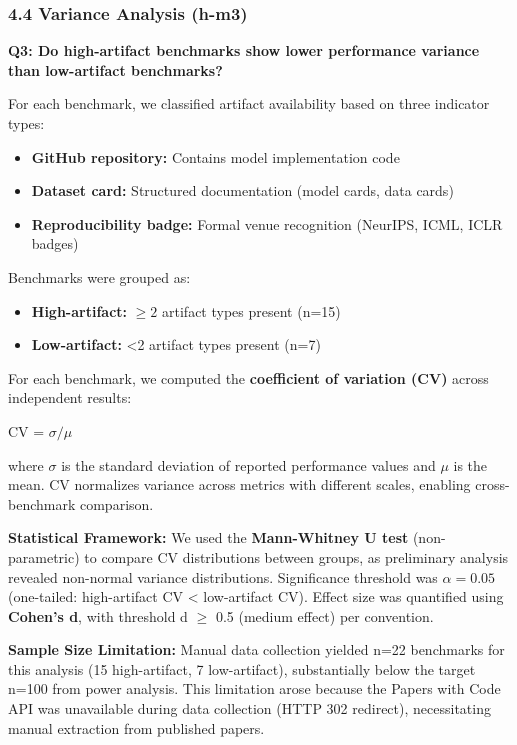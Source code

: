 \subsubsection{4.4 Variance Analysis (h-m3)}

\textbf{Q3: Do high-artifact benchmarks show lower performance variance than low-artifact benchmarks?}

For each benchmark, we classified artifact availability based on three indicator types:
\begin{itemize}
\item \textbf{GitHub repository:} Contains model implementation code
\item \textbf{Dataset card:} Structured documentation (model cards, data cards)
\item \textbf{Reproducibility badge:} Formal venue recognition (NeurIPS, ICML, ICLR badges)
\end{itemize}

Benchmarks were grouped as:
\begin{itemize}
\item \textbf{High-artifact:} $\geq 2$ artifact types present (n=15)
\item \textbf{Low-artifact:} <2 artifact types present (n=7)
\end{itemize}

For each benchmark, we computed the \textbf{coefficient of variation (CV)} across independent results:

CV = $\sigma /\mu$

where $\sigma$ is the standard deviation of reported performance values and $\mu$ is the mean. CV normalizes variance across metrics with different scales, enabling cross-benchmark comparison.

\textbf{Statistical Framework:} We used the \textbf{Mann-Whitney U test} (non-parametric) to compare CV distributions between groups, as preliminary analysis revealed non-normal variance distributions. Significance threshold was $\alpha =0.05$ (one-tailed: high-artifact CV < low-artifact CV). Effect size was quantified using \textbf{Cohen's d}, with threshold d $\geq$ 0.5 (medium effect) per convention.

\textbf{Sample Size Limitation:} Manual data collection yielded n=22 benchmarks for this analysis (15 high-artifact, 7 low-artifact), substantially below the target n=100 from power analysis. This limitation arose because the Papers with Code API was unavailable during data collection (HTTP 302 redirect), necessitating manual extraction from published papers.

